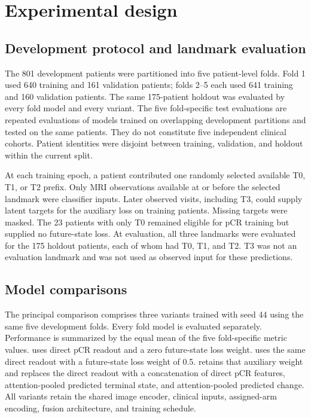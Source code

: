 \section{Experimental design}
\label{sec:experiments}
\subsection{Development protocol and landmark evaluation}
The 801 development patients were partitioned into five patient-level folds. Fold 1 used 640 training and 161 validation patients; folds 2--5 each used 641 training and 160 validation patients. The same 175-patient holdout was evaluated by every fold model and every variant. The five fold-specific test evaluations are repeated evaluations of models trained on overlapping development partitions and tested on the same patients. They do not constitute five independent clinical cohorts. Patient identities were disjoint between training, validation, and holdout within the current split.

At each training epoch, a patient contributed one randomly selected available T0, T1, or T2 prefix. Only MRI observations available at or before the selected landmark were classifier inputs. Later observed visits, including T3, could supply latent targets for the auxiliary loss on training patients. Missing targets were masked. The 23 patients with only T0 remained eligible for pCR training but supplied no future-state loss. At evaluation, all three landmarks were evaluated for the 175 holdout patients, each of whom had T0, T1, and T2. T3 was not an evaluation landmark and was not used as observed input for these predictions.

\subsection{Model comparisons}
The principal comparison comprises three variants trained with seed 44 using the same five development folds. Every fold model is evaluated separately. Performance is summarized by the equal mean of the five fold-specific metric values. \nojepa{} uses direct pCR readout and a zero future-state loss weight. \direct{} uses the same direct readout with a future-state loss weight of 0.5. \fullmodel{} retains that auxiliary weight and replaces the direct readout with a concatenation of direct pCR features, attention-pooled predicted terminal state, and attention-pooled predicted change. All variants retain the shared image encoder, clinical inputs, assigned-arm encoding, fusion architecture, and training schedule.

